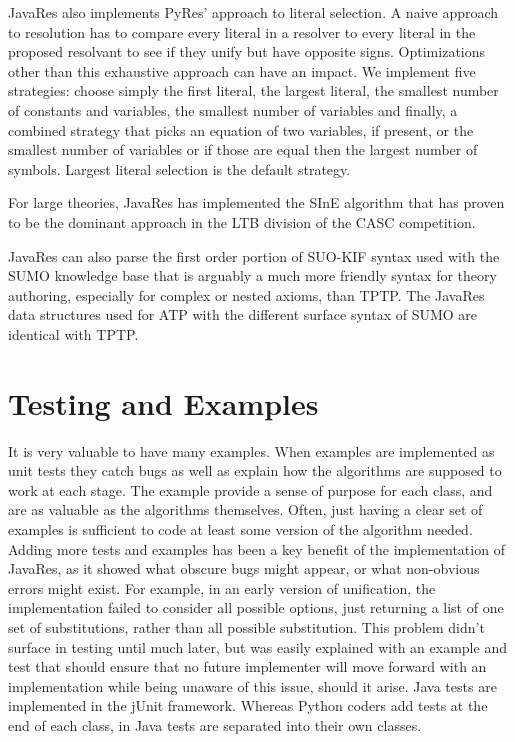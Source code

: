 \documentclass{llncs}
\begin{document}
JavaRes also implements PyRes' approach to literal selection.  A naive
approach to resolution has to compare every literal in a resolver to
every literal in the proposed resolvant to see if they unify but have
opposite signs.  Optimizations other than this exhaustive approach can
have an impact.  We implement five strategies: choose simply the first
literal, the largest literal, the smallest number of constants and
variables, the smallest number of variables and finally, a combined
strategy that picks an equation of two variables, if present, or the
smallest number of variables or if those are equal then the largest
number of symbols.  Largest literal selection is the default strategy.

For large theories, JavaRes has implemented the SInE
algorithm\cite{HV:CADE-2011} that has proven to be the dominant approach in the
LTB division of the CASC competition.

JavaRes can also parse the first order portion of SUO-KIF syntax used
with the SUMO knowledge base that is arguably a much more friendly
syntax for theory authoring, especially for complex or nested axioms,
than TPTP.  The JavaRes data structures used for ATP with the different surface
syntax of SUMO are identical with TPTP.


\section{Testing and Examples}

It is very valuable to have many examples.  When examples are
implemented as unit tests they catch bugs as well as explain how the
algorithms are supposed to work at each stage.  The example provide a
sense of purpose for each class, and are as valuable as the algorithms
themselves.  Often, just having a clear set of examples is sufficient
to code at least some version of the algorithm needed.  Adding more
tests and examples has been a key benefit of the implementation of
JavaRes, as it showed what obscure bugs might appear, or what
non-obvious errors might exist.  For example, in an early version of
unification, the implementation failed to consider all possible
options, just returning a list of one set of substitutions, rather
than all possible substitution.  This problem didn't surface in
testing until much later, but was easily explained with an example and
test that should ensure that no future implementer will move forward
with an implementation while being unaware of this issue, should it
arise.  Java tests are implemented in the jUnit framework.  Whereas
Python coders add tests at the end of each class, in Java tests are
separated into their own classes.
\end{document}
